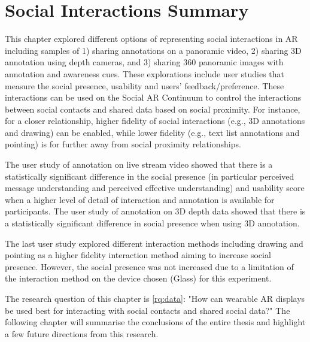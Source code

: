 \pagebreak
\section{Social Interactions Summary}

This chapter explored different options of representing social interactions in AR including samples of 1) sharing annotations on a panoramic video, 2) sharing 3D annotation using depth cameras, and 3) sharing 360 panoramic images with annotation and awareness cues. These explorations include user studies that measure the social presence, usability and users' feedback/preference. These interactions can be used on the Social AR Continuum to control the interactions between social contacts and shared data based on social proximity. For instance, for a closer relationship, higher fidelity of social interactions (e.g., 3D annotations and drawing) can be enabled, while lower fidelity (e.g., text list annotations and pointing) is for further away from social proximity relationships.

The user study of annotation on live stream video showed that there is a statistically significant difference in the social presence (in particular perceived message understanding and perceived effective understanding) and usability score when a higher level of detail of interaction and annotation is available for participants. The user study of annotation on 3D depth data showed that there is a statistically significant difference in social presence when using 3D annotation. 

The last user study explored different interaction methods including drawing and pointing as a higher fidelity interaction method aiming to increase social presence. However, the social presence was not increased due to a limitation of the interaction method on the device chosen (Glass) for this experiment.

The research question of this chapter is \ref{rq:data}: "How can wearable AR displays be used best for interacting with social contacts and shared social data?"  
The following chapter will summarise the conclusions of the entire thesis and highlight a few future directions from this research.
